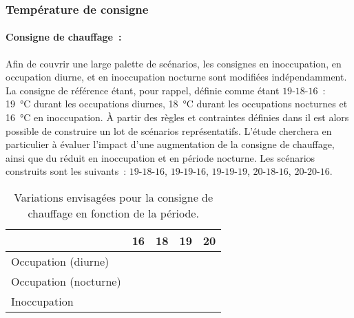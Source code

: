 \subsubsection{Température de consigne} %
\label{ssub:temperature_de_consigne}
\paragraph{Consigne de chauffage~:} %
\label{par:consigne_de_chauffage}
Afin de couvrir une large palette de scénarios, les consignes en inoccupation, en occupation
diurne, et en inoccupation nocturne sont modifiées indépendamment. La consigne de
référence étant, pour rappel, définie comme étant $19$-$18$-$16$~: \SI{19}{\celsius} durant les
occupations diurnes, \SI{18}{\celsius} durant les occupations nocturnes et
\SI{16}{\celsius} en inoccupation. À partir des règles et contraintes définies dans
 il est alors possible de construire un lot de scénarios
représentatifs. L’étude cherchera en particulier à évaluer l’impact d’une augmentation de
la consigne de chauffage, ainsi que du réduit en inoccupation et en période
nocturne. Les scénarios construits sont les suivants~: $19$-$18$-$16$, $19$-$19$-$16$, $19$-$19$-$19$,
$20$-$18$-$16$, $20$-$20$-$16$.

\begin{table}
\centering
\caption[Variations envisagées pour la consigne de chauffage en fonction de la période]
        {Variations envisagées pour la consigne de chauffage en fonction de la période.}
\label{tab:consigne_chauffage}
\begin{tabular}{l c c c c}
    \toprule
                           & \textbf{\num{16}}                     & \textbf{\num{18}}                     & \textbf{\num{19}}                     & \textbf{\num{20}}              \\
    \midrule
    Occupation (diurne)    &                             &                             & \cellcolor{SolarizedBrBlue} & \cellcolor{SolarizedBrBlue} \\
    Occupation (nocturne)  &                             & \cellcolor{SolarizedBrBlue} & \cellcolor{SolarizedBrBlue} & \cellcolor{SolarizedBrBlue} \\
    Inoccupation           & \cellcolor{SolarizedBrBlue} &                             & \cellcolor{SolarizedBrBlue} &                     \\
    \bottomrule
\end{tabular}
\end{table}



